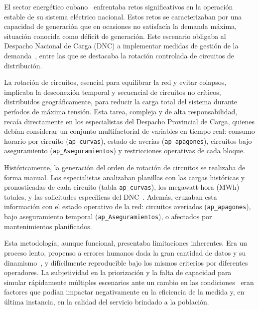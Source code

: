 \introduction

El sector energético cubano~\citep{ministerio2023} enfrentaba retos significativos en la operación estable de su sistema eléctrico nacional. Estos retos se caracterizaban por una capacidad de generación que en ocasiones no satisfacía la demanda máxima, situación conocida como déficit de generación. Este escenario obligaba al Despacho Nacional de Carga (DNC) a implementar medidas de gestión de la demanda~\citep{union2023}, entre las que se destacaba la rotación controlada de circuitos de distribución.

La rotación de circuitos, esencial para equilibrar la red y evitar colapsos, implicaba la desconexión temporal y secuencial de circuitos no críticos, distribuidos geográficamente, para reducir la carga total del sistema durante períodos de máxima tensión. Esta tarea, compleja y de alta responsabilidad, recaía directamente en los especialistas del Despacho Provincial de Carga, quienes debían considerar un conjunto multifactorial de variables en tiempo real: consumo horario por circuito (\texttt{ap\_curvas}), estado de averías (\texttt{ap\_apagones}), circuitos bajo aseguramiento (\texttt{ap\_Aseguramientos}) y restricciones operativas de cada bloque.

Históricamente, la generación del orden de rotación de circuitos se realizaba de forma manual. Los especialistas analizaban planillas con las cargas históricas y pronosticadas de cada circuito (tabla \texttt{ap\_curvas}), los megawatt-hora (MWh) totales, y las solicitudes específicas del DNC~\citep{union2023}. Además, cruzaban esta información con el estado operativo de la red: circuitos averiados (\texttt{ap\_apagones}), bajo aseguramiento temporal (\texttt{ap\_Aseguramientos}), o afectados por mantenimientos planificados.

Esta metodología, aunque funcional, presentaba limitaciones inherentes. Era un proceso lento, propenso a errores humanos dada la gran cantidad de datos y su dinamismo~\citep{pressman2020}, y difícilmente reproducible bajo los mismos criterios por diferentes operadores. La subjetividad en la priorización y la falta de capacidad para simular rápidamente múltiples escenarios ante un cambio en las condiciones~\citep{zhou2023} eran factores que podían impactar negativamente en la eficiencia de la medida y, en última instancia, en la calidad del servicio brindado a la población.

